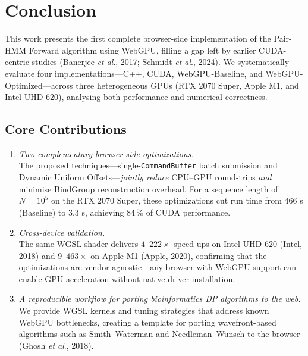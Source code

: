 \documentclass[PhD]{PHlab-thesis}
\begin{document}
\chapter{Conclusion}

This work presents the first complete browser-side implementation of the Pair-HMM Forward algorithm using WebGPU, filling a gap left by earlier CUDA-centric studies (Banerjee \emph{et al}., 2017; Schmidt \emph{et al}., 2024).  
We systematically evaluate four implementations—C++, CUDA, WebGPU-Baseline, and WebGPU-Optimized—across three heterogeneous GPUs (RTX 2070 Super, Apple M1, and Intel UHD 620), analysing both performance and numerical correctness.

\section{Core Contributions}

\begin{enumerate}
  \item \emph{Two complementary browser-side optimizations.}\\
        The proposed techniques—single-\texttt{CommandBuffer} batch submission and Dynamic Uniform Offsets—\emph{jointly reduce} CPU–GPU round-trips \emph{and} minimise BindGroup reconstruction overhead.  
        For a sequence length of $N = 10^{5}$ on the RTX 2070 Super, these optimizations cut run time from $466$ s (Baseline) to $3.3$ s, achieving $84\,\%$ of CUDA performance.

  \item \emph{Cross-device validation.}\\
        The same WGSL shader delivers $4$–$222\times$ speed-ups on Intel UHD 620 (Intel, 2018) and $9$–$463\times$ on Apple M1 (Apple, 2020), confirming that the optimizations are vendor-agnostic—any browser with WebGPU support can enable GPU acceleration without native-driver installation.

  \item \emph{A reproducible workflow for porting bioinformatics DP algorithms to the web.}\\
        We provide WGSL kernels and tuning strategies that address known WebGPU bottlenecks, creating a template for porting wavefront-based algorithms such as Smith–Waterman and Needleman–Wunsch to the browser (Ghosh \emph{et al}., 2018).
\end{enumerate}

\end{document}
